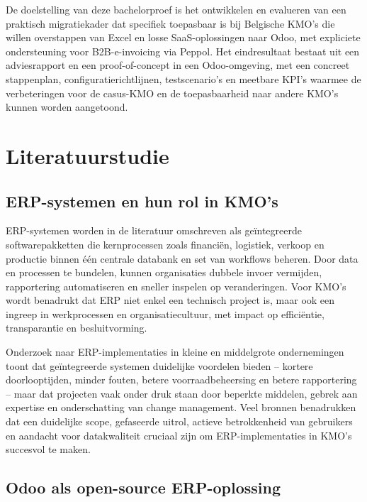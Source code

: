 De doelstelling van deze bachelorproef is het ontwikkelen en evalueren van een praktisch migratiekader dat specifiek toepasbaar is bij Belgische KMO’s die willen overstappen van Excel en losse SaaS-oplossingen naar Odoo, met expliciete ondersteuning voor B2B-e-invoicing via Peppol. Het eindresultaat bestaat uit een adviesrapport en een proof-of-concept in een Odoo-omgeving, met een concreet stappenplan, configuratierichtlijnen, testscenario’s en meetbare KPI’s waarmee de verbeteringen voor de casus-KMO en de toepasbaarheid naar andere KMO’s kunnen worden aangetoond.


\section{Literatuurstudie}%
\label{sec:literatuurstudie}

\subsection{ERP-systemen en hun rol in KMO’s}

ERP-systemen worden in de literatuur omschreven als geïntegreerde softwarepakketten die kernprocessen zoals financiën, logistiek, verkoop en productie binnen één centrale databank en set van workflows beheren.\autocite{SAP_2023,IBM_2023} Door data en processen te bundelen, kunnen organisaties dubbele invoer vermijden, rapportering automatiseren en sneller inspelen op veranderingen. Voor KMO’s wordt benadrukt dat ERP niet enkel een technisch project is, maar ook een ingreep in werkprocessen en organisatiecultuur, met impact op efficiëntie, transparantie en besluitvorming.\autocite{Mestica_2024}

Onderzoek naar ERP-implementaties in kleine en middelgrote ondernemingen toont dat geïntegreerde systemen duidelijke voordelen bieden – kortere doorlooptijden, minder fouten, betere voorraadbeheersing en betere rapportering – maar dat projecten vaak onder druk staan door beperkte middelen, gebrek aan expertise en onderschatting van change management.\autocite{Mestica_2024,SAP_2023,Gartner_2023} Veel bronnen benadrukken dat een duidelijke scope, gefaseerde uitrol, actieve betrokkenheid van gebruikers en aandacht voor datakwaliteit cruciaal zijn om ERP-implementaties in KMO’s succesvol te maken.

\subsection{Odoo als open-source ERP-oplossing}

